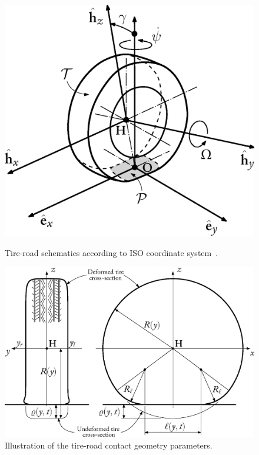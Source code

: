 \begin{figure}[htb]
  \centering
  \begin{minipage}[t]{0.425\linewidth}
    \centering
    \includegraphics[width=0.9\linewidth]{figures/appendix_3/tire_iso}
    \caption{Tire-road schematics according to ISO coordinate system~\cite{iso88552011}.}
    \label{app3:fig:tire_iso}
  \end{minipage}
  \hfill
  \begin{minipage}[t]{0.525\linewidth}
    \centering
    \includegraphics[width=1.0\linewidth]{figures/appendix_3/belt_section}
    \caption{Illustration of the tire-road contact geometry parameters.}
    \label{app3:fig:belt_section}
  \end{minipage}
\end{figure}

